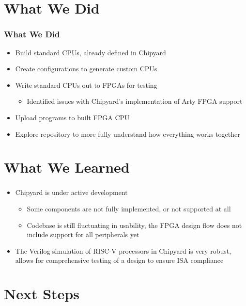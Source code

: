 \documentclass{eceday}
\begin{document}
\section{What We Did}\label{sec:What_We_Did}
\begin{frame}
  \frametitle{What We Did}
  \begin{itemize}
  \item Build standard CPUs, already defined in Chipyard
  \item Create configurations to generate custom CPUs
  \item Write standard CPUs out to FPGAs for testing
    \begin{itemize}
    \item Identified issues with Chipyard's implementation of Arty FPGA support
    \end{itemize}
  \item Upload programs to built FPGA CPU
  \item Explore repository to more fully understand how everything works together
  \end{itemize}
\end{frame}

\section{What We Learned}\label{sec:What_We_Learned}
\begin{frame}
  \frametitle{}
  \begin{itemize}
  \item Chipyard is under active development
    \begin{itemize}
    \item Some components are not fully implemented, or not supported at all
    \item Codebase is still fluctuating in usability, the FPGA design flow does not include support for all peripherals yet
    
    \end{itemize}
  \item The Verilog simulation of RISC-V processors in Chipyard is very robust, allows for comprehensive testing of a design to ensure ISA compliance
  \end{itemize}
\end{frame}

\section{Next Steps}\label{sec:Next_Steps}
\end{document}

